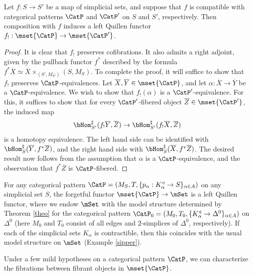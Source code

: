 \begin{proposition}\label{supper}
Let $f: S \rightarrow S'$ be a map of simplicial sets, and suppose that $f$ is compatible with
categorical patterns $\CatP$ and $\CatP'$ on $S$ and $S'$, respectively. Then composition
with $f$ induces a left Quillen functor $f_{!}: \mset{ \CatP} \rightarrow \mset{ \CatP'}$.
\end{proposition}

\begin{proof}
It is clear that $f_{!}$ preserves cofibrations. It also admits a right adjoint, given by the pullback functor
$f^{\ast}$ described by the formula $f^{\ast} \overline{X} \simeq \overline{X} \times_{ (S', M_{S'}) } (S, M_S)$. To complete the proof, it will suffice to show that $f_{!}$ preserves $\CatP$-equivalences.
Let $\overline{X}, \overline{Y} \in \mset{\CatP}$, and let $\alpha: \overline{X} \rightarrow \overline{Y}$
be a $\CatP$-equivalence. We wish to show that $f_{!}(\alpha)$ is a $\CatP'$-equivalence.
For this, it suffices to show that for every $\CatP'$-fibered object $\overline{Z} \in \mset{ \CatP'}$, the induced map
$$ \bHom^{\sharp}_{S'}( f_{!} \overline{Y}, \overline{Z}) \rightarrow \bHom^{\sharp}_{S'}(f_{!} \overline{X}, \overline{Z} )$$
is a homotopy equivalence. The left hand side can be identified with $\bHom^{\sharp}_{S}( \overline{Y}, f^{\ast} \overline{Z})$, and the right hand side with $\bHom^{\sharp}_{S}( \overline{X}, f^{\ast} \overline{Z})$. The desired result now follows from the assumption that $\alpha$ is a
$\CatP$-equivalence, and the observation that $f^{\ast} \overline{Z}$ is $\CatP$-fibered.
\end{proof}

\begin{example}\label{megaparnum}
For any categorical pattern $\CatP = (M_{S}, T, \{ p_{\alpha}: K_{\alpha}^{\triangleleft} \rightarrow S\}_{\alpha \in A})$ on any simplicial set $S$, the forgetful functor
$\mset{ \CatP} \rightarrow \mSet$ is a left Quillen functor, where we endow
$\mSet$ with the model structure determined by Theorem \ref{theo} for the
categorical pattern $\CatP_{0} = (M_0, T_0, \{ K_{\alpha}^{\triangleleft} \rightarrow \Delta^0 \}_{\alpha \in A})$ on $\Delta^0$ (here $M_0$ and $T_0$ consist of all edges and $2$-simplices
of $\Delta^0$, respectively). If each of the simplicial sets $K_{\alpha}$ is contractible, then
this coincides with the usual model structure on $\mSet$ (Example \ref{sipper}).
\end{example}

Under a few mild hypotheses on a categorical pattern $\CatP$, we can characterize the fibrations
between fibrant objects in $\mset{ \CatP}$.

